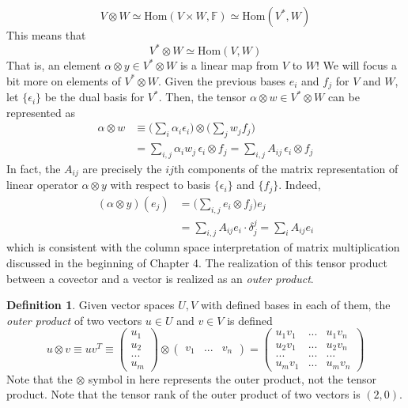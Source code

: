 \documentclass{article}
\theoremstyle{remark}
\theoremstyle{definition}
\newtheorem{definition}{Definition}[section]
\begin{document}
\[V \otimes W \simeq \text{Hom}(V \times W, \mathbb{F}) \simeq \text{Hom}(V^*, W)\]
This means that
\[V^* \otimes W \simeq \text{Hom}(V, W)\]
That is, an element $\alpha \otimes y \in V^* \otimes W$ is a linear map from $V$ to $W$! We will focus a bit more on elements of $V^* \otimes W$. Given the previous bases $e_i$ and $f_j$ for $V$ and $W$, let $\{\epsilon_i\}$ be the dual basis for $V^*$. Then, the tensor $\alpha \otimes w \in V^* \otimes W$ can be represented as 
\begin{align*}
    \alpha \otimes w & \equiv \bigg(\sum_i \alpha_i \epsilon_i \bigg) \otimes \bigg( \sum_j w_j f_j \bigg) \\
    & = \sum_{i, j} \alpha_i w_j \, \epsilon_i \otimes f_j = \sum_{i, j} A_{i j} \, \epsilon_i \otimes f_j
\end{align*}
In fact, the $A_{i j}$ are precisely the $i j$th components of the matrix representation of linear operator $\alpha \otimes y$ with respect to basis $\{\epsilon_i\}$ and $\{f_j\}$. Indeed,
\begin{align*}
    (\alpha \otimes y)(e_j) & = \bigg( \sum_{i, j} e_i \otimes f_j \bigg) e_j \\
    & = \sum_{i, j} A_{i j} e_i \cdot \delta^j_j = \sum_{i} A_{i j} e_i
\end{align*}
which is consistent with the column space interpretation of matrix multiplication discussed in the beginning of Chapter 4. The realization of this tensor product between a covector and a vector is realized as an \textit{outer product}. 

\begin{definition}
Given vector spaces $U, V$ with defined bases in each of them, the \textit{outer product} of two vectors $u \in U$ and $v \in V$ is defined
\[u \otimes v \equiv u v^T \equiv \begin{pmatrix}
u_1 \\ u_2 \\ ... \\ u_m
\end{pmatrix} \otimes \begin{pmatrix}
v_1 & ... & v_n
\end{pmatrix} = \begin{pmatrix}
u_1 v_1 & ... & u_1 v_n \\
u_2 v_1 & ... & u_2 v_n \\
... & ... & ... \\
u_m v_1 & ... & u_m v_n 
\end{pmatrix}\]
Note that the $\otimes$ symbol in here represents the outer product, not the tensor product. Note that the tensor rank of the outer product of two vectors is $(2,0)$. 
\end{definition}
\end{document}
